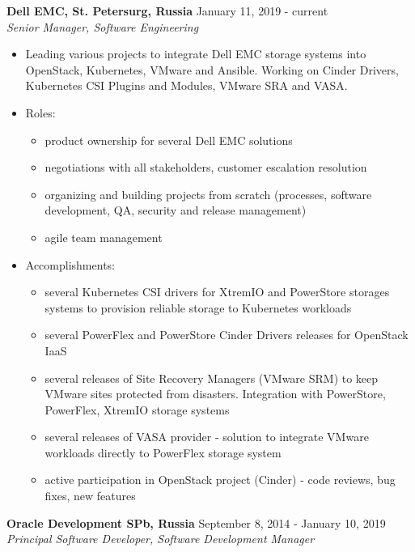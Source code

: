 \documentclass[a4paper,12pt,]{article}
\begin{document}
  \begin{description}

  \item{\bfseries Dell EMC, St. Petersurg, Russia} \hfill January 11, 2019 - current \\
    {\em Senior Manager, Software Engineering}

    \begin{itemize}

    \item Leading various projects to integrate Dell EMC storage systems into OpenStack, Kubernetes, VMware and Ansible.
	  Working on Cinder Drivers, Kubernetes CSI Plugins and Modules, VMware SRA and VASA.

    \item Roles:
        \begin{itemize}
        \item product ownership for several Dell EMC solutions
        \item negotiations with all stakeholders, customer escalation resolution
        \item organizing and building projects from scratch (processes, software development, QA, security and release management)
 	\item agile team management
        \end{itemize}

    \item Accomplishments:
        \begin{itemize}
        \item several Kubernetes CSI drivers for XtremIO and PowerStore storages systems to provision reliable storage to Kubernetes workloads
        \item several PowerFlex and PowerStore Cinder Drivers releases for OpenStack IaaS
        \item several releases of Site Recovery Managers (VMware SRM) to keep VMware sites protected from disasters. Integration with PowerStore, PowerFlex, XtremIO storage systems
	\item several releases of VASA provider - solution to integrate VMware workloads directly to PowerFlex storage system
	\item active participation in OpenStack project (Cinder) - code reviews, bug fixes, new features
        \end{itemize}
    \end{itemize}

  \item{\bfseries Oracle Development SPb, Russia} \hfill September 8, 2014 - January 10, 2019 \\
    {\em Principal Software Developer, Software Development Manager}


\end{description}
\end{document}
